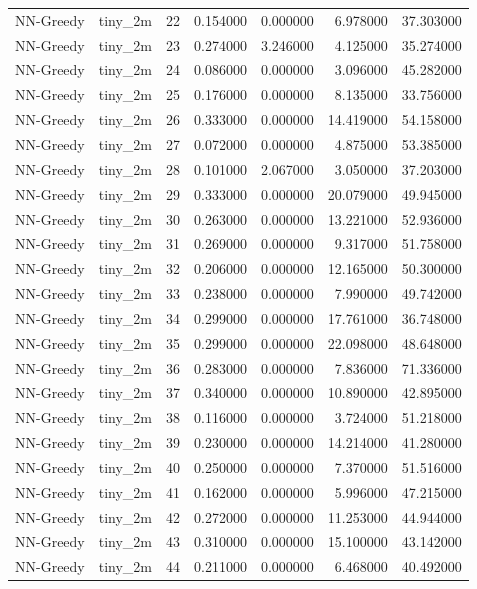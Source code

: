 \begin{tabular}{llrrrrr}
NN-Greedy & tiny_2m & 22 & 0.154000 & 0.000000 & 6.978000 & 37.303000 \\
NN-Greedy & tiny_2m & 23 & 0.274000 & 3.246000 & 4.125000 & 35.274000 \\
NN-Greedy & tiny_2m & 24 & 0.086000 & 0.000000 & 3.096000 & 45.282000 \\
NN-Greedy & tiny_2m & 25 & 0.176000 & 0.000000 & 8.135000 & 33.756000 \\
NN-Greedy & tiny_2m & 26 & 0.333000 & 0.000000 & 14.419000 & 54.158000 \\
NN-Greedy & tiny_2m & 27 & 0.072000 & 0.000000 & 4.875000 & 53.385000 \\
NN-Greedy & tiny_2m & 28 & 0.101000 & 2.067000 & 3.050000 & 37.203000 \\
NN-Greedy & tiny_2m & 29 & 0.333000 & 0.000000 & 20.079000 & 49.945000 \\
NN-Greedy & tiny_2m & 30 & 0.263000 & 0.000000 & 13.221000 & 52.936000 \\
NN-Greedy & tiny_2m & 31 & 0.269000 & 0.000000 & 9.317000 & 51.758000 \\
NN-Greedy & tiny_2m & 32 & 0.206000 & 0.000000 & 12.165000 & 50.300000 \\
NN-Greedy & tiny_2m & 33 & 0.238000 & 0.000000 & 7.990000 & 49.742000 \\
NN-Greedy & tiny_2m & 34 & 0.299000 & 0.000000 & 17.761000 & 36.748000 \\
NN-Greedy & tiny_2m & 35 & 0.299000 & 0.000000 & 22.098000 & 48.648000 \\
NN-Greedy & tiny_2m & 36 & 0.283000 & 0.000000 & 7.836000 & 71.336000 \\
NN-Greedy & tiny_2m & 37 & 0.340000 & 0.000000 & 10.890000 & 42.895000 \\
NN-Greedy & tiny_2m & 38 & 0.116000 & 0.000000 & 3.724000 & 51.218000 \\
NN-Greedy & tiny_2m & 39 & 0.230000 & 0.000000 & 14.214000 & 41.280000 \\
NN-Greedy & tiny_2m & 40 & 0.250000 & 0.000000 & 7.370000 & 51.516000 \\
NN-Greedy & tiny_2m & 41 & 0.162000 & 0.000000 & 5.996000 & 47.215000 \\
NN-Greedy & tiny_2m & 42 & 0.272000 & 0.000000 & 11.253000 & 44.944000 \\
NN-Greedy & tiny_2m & 43 & 0.310000 & 0.000000 & 15.100000 & 43.142000 \\
NN-Greedy & tiny_2m & 44 & 0.211000 & 0.000000 & 6.468000 & 40.492000 \\

\end{tabular}
